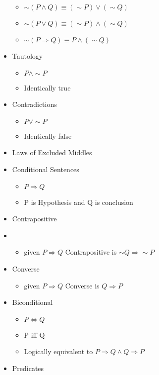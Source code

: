 \documentclass{article}
\begin{document}
\begin{itemize}
    \begin{itemize}
        \item $\sim (P \land Q) \equiv (\sim P) \lor (\sim Q) $
        \item $\sim (P \lor Q) \equiv (\sim P) \land (\sim Q) $
        \item $\sim (P \Rightarrow Q) \equiv P \land (\sim Q)$
    \end{itemize}
    \item Tautology
    \begin{itemize}
        \item $P \land \sim P$
        \item Identically true
    \end{itemize}
    \item Contradictions
    \begin{itemize}
        \item  $P \lor \sim P$
        \item Identically false
    \end{itemize}
    \item Laws of Excluded Middles
    \item Conditional Sentences
    \begin{itemize}
        \item $P \Rightarrow Q$
        \item P is Hypothesis and Q is conclusion
    \end{itemize}
    \item Contrapositive
    \item \begin{itemize}
        \item given $P \Rightarrow Q$ Contrapositive is $\sim Q \Rightarrow \sim P$
    \end{itemize}
    \item Converse
    \begin{itemize}
        \item given $P \Rightarrow Q$ Converse is $ Q \Rightarrow P$ 
    \end{itemize}
    \item Biconditional
    \begin{itemize}
        \item $P \Leftrightarrow Q$ 
        \item P iff Q
        \item Logically equivalent to $P \Rightarrow Q \land Q \Rightarrow P $
    \end{itemize}
    \item Predicates

\end{itemize}
\end{document}
